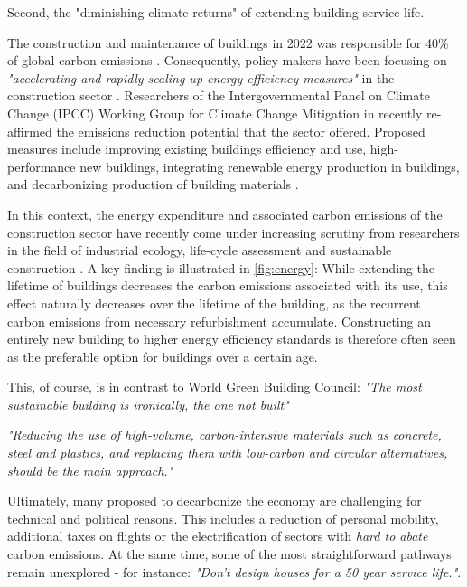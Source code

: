 \documentclass{article}
\begin{document}
\clearpage
\begin{multicols}{2}

Second, the "diminishing climate returns" of extending building service-life.

The construction and maintenance of buildings in 2022 was responsible for 40\% of global carbon emissions \cite{camarasa_energy_2023}. Consequently, policy makers have been focusing on \textit{"accelerating and rapidly scaling up energy efficiency measures"} in the construction sector \cite{noauthor_2022_2022}. Researchers of the Intergovernmental Panel on Climate Change (IPCC) Working Group for Climate Change Mitigation in recently re-affirmed the emissions reduction potential that the sector offered. Proposed measures include improving existing buildings efficiency and use, high-performance new buildings, integrating renewable energy production in buildings, and decarbonizing production of building materials \cite{shukla_mitigation_2022}.

In this context, the energy expenditure and associated carbon emissions of the construction sector have recently come under increasing scrutiny from researchers in the field of industrial ecology, life-cycle assessment and sustainable construction \cite{chau_review_2015}\cite{ortiz_sustainability_2009}. A key finding is illustrated in \cref{fig:energy}: While extending the lifetime of buildings decreases the carbon emissions associated with its use, this effect naturally decreases over the lifetime of the building, as the recurrent carbon emissions from necessary refurbishment accumulate. Constructing an entirely new building to higher energy efficiency standards is therefore often seen as the preferable option for buildings over a certain age.

This, of course, is in contrast to World Green Building Council: \textit{"The most sustainable building is ironically, the one not built"}

\textit{"Reducing the use of high-volume, carbon-intensive materials such as concrete, steel and plastics, and replacing them with low-carbon and circular alternatives, should be the main approach."} \cite[Sec. 7.4]{noauthor_2022_2022}

Ultimately, many proposed to decarbonize the economy are challenging for technical and political reasons. This includes a reduction of personal mobility, additional taxes on flights or the electrification of sectors with \textit{hard to abate} carbon emissions. At the same time, some of the most straightforward pathways remain unexplored - for instance: \textit{"Don't design houses for a 50 year service life."}.

\end{multicols}
\end{document}
